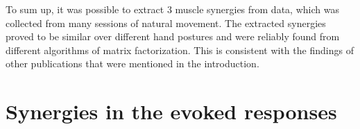 


To sum up, it was possible to extract 3 muscle synergies from data, which was collected from many sessions of natural movement.
The extracted synergies proved to be similar over different hand postures and were reliably found from different algorithms of
matrix factorization. This is consistent with the findings of other publications that were mentioned in the introduction.



\clearpage



\section{Synergies in the evoked responses} %
\label{sg:sec:evoked_syns}

